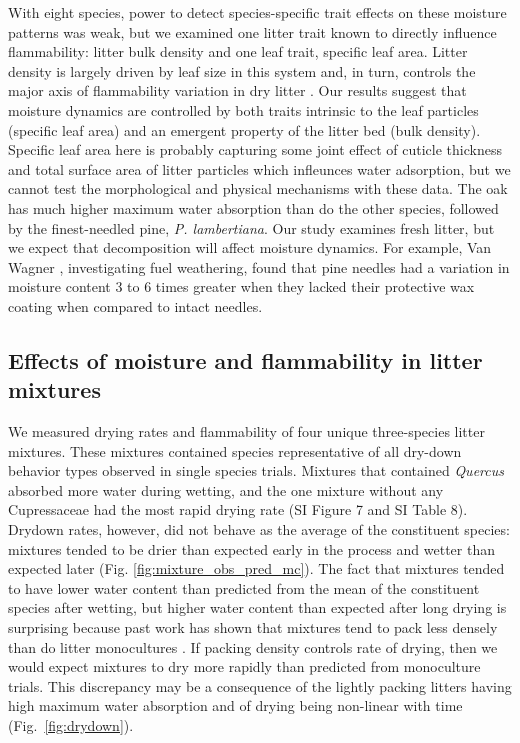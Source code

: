\documentclass[letterpaper,12pt]{article}
\begin{document}
With eight species, power to detect species-specific trait effects on these
moisture patterns was weak, but we examined one litter trait known to directly
influence flammability: litter bulk density and one leaf trait, specific leaf
area. Litter density is largely driven by leaf size in this system and, in
turn, controls the major axis of flammability variation in dry litter
\citep{Magalhaes+Schwilk-2012}. Our results suggest that moisture dynamics are
controlled by both traits intrinsic to the leaf particles (specific leaf area)
and an emergent property of the litter bed (bulk density). Specific leaf area
here is probably capturing some joint effect of cuticle thickness and total
surface area of litter particles which infleunces water adsorption, but we
cannot test the morphological and physical mechanisms with these data. The oak
has much higher maximum water absorption than do the other species, followed by
the finest-needled pine, \emph{P. lambertiana}. Our study examines fresh
litter, but we expect that decomposition will affect moisture dynamics. For
example, Van Wagner \citeyear{Van_Wagner-1969}, investigating fuel weathering,
found that pine needles had a variation in moisture content 3 to 6 times
greater when they lacked their protective wax coating when compared to intact
needles.

\subsection*{Effects of moisture and flammability in litter mixtures}

We measured drying rates and flammability of four unique three-species litter
mixtures. These mixtures contained species representative of all dry-down
behavior types observed in single species trials. Mixtures that contained
\emph{Quercus} absorbed more water during wetting, and the one mixture without
any Cupressaceae had the most rapid drying rate (SI Figure 7 and SI Table 8).
Drydown rates, however, did not behave as the average of the constituent
species: mixtures tended to be drier than expected early in the process and
wetter than expected later (Fig. \ref{fig:mixture_obs_pred_mc}). The fact that
mixtures tended to have lower water content than predicted from the mean of the
constituent species after wetting, but higher water content than expected after
long drying is surprising because past work has shown that mixtures tend to
pack less densely than do litter monocultures \citep[][Table
2]{Magalhaes+Schwilk-2012}. If packing density controls rate of drying, then we
would expect mixtures to dry more rapidly than predicted from monoculture
trials. This discrepancy may be a consequence of the lightly packing litters
having high maximum water absorption and of drying being non-linear with time
(Fig.~\ref{fig:drydown}).
\end{document}
